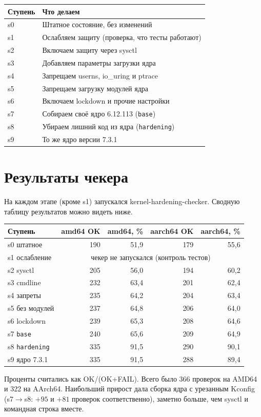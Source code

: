 \documentclass[11pt,a4paper]{article}
\newcommand{\cmd}[1]{\texttt{#1}}
\begin{document}
\begin{tabular}{@{}ll@{}}
\toprule
Ступень & Что делаем\\
\midrule
s0 & Штатное состояние, без изменений\\
s1 & Ослабляем защиту (проверка, что тесты работают)\\
s2 & Включаем защиту через sysctl\\
s3 & Добавляем параметры загрузки ядра\\
s4 & Запрещаем userns, io\_uring и ptrace\\
s5 & Запрещаем загрузку модулей ядра\\
s6 & Включаем lockdown и прочие настройки\\
s7 & Собираем своё ядро 6.12.113 (\cmd{base})\\
s8 & Убираем лишний код из ядра (\cmd{hardening})\\
s9 & То же ядро версии 7.3.1\\
\bottomrule
\end{tabular}

\section{Результаты чекера}
На каждом этапе (кроме s1) запускался kernel-hardening-checker. Сводную таблицу результатов можно видеть ниже.

\begin{tabular}{@{}lrrrr@{}}
\toprule
Ступень & amd64 OK & amd64, \% & aarch64 OK & aarch64, \%\\
\midrule
s0 штатное & 190 & 51,9 & 179 & 55,6\\
s1 ослабление & \multicolumn{4}{c}{чекер не запускался (контроль тестов)}\\
s2 sysctl & 205 & 56,0 & 194 & 60,2\\
s3 cmdline & 232 & 63,4 & 201 & 62,4\\
s4 запреты & 235 & 64,2 & 204 & 63,4\\
s5 без модулей & 237 & 64,8 & 206 & 64,0\\
s6 lockdown & 239 & 65,3 & 208 & 64,6\\
s7 \cmd{base} & 240 & 65,6 & 209 & 64,9\\
s8 \cmd{hardening} & 335 & 91,5 & 290 & 90,1\\
s9 ядро 7.3.1 & 335 & 91,5 & 288 & 89,4\\
\bottomrule
\end{tabular}

\smallskip\noindent Проценты считались как OK/(OK+FAIL). Всего было 366 проверок на AMD64 и 322 на AArch64. Наибольший прирост дала сборка ядра с урезанным Kconfig (s7$\to$s8: $+95$ и $+81$ проверок соответственно), заметно больше, чем sysctl и командная строка вместе.
\end{document}
